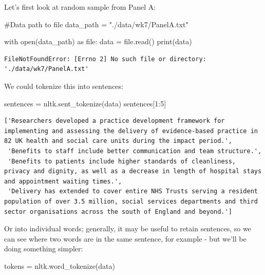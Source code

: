 \documentclass[
  letterpaper,
  DIV=11,
  numbers=noendperiod]{scrreprt}
\newenvironment{Shaded}{\begin{snugshade}}{\end{snugshade}}
\newcommand{\BuiltInTok}[1]{\textcolor[rgb]{0.00,0.23,0.31}{#1}}
\newcommand{\CommentTok}[1]{\textcolor[rgb]{0.37,0.37,0.37}{#1}}
\newcommand{\ControlFlowTok}[1]{\textcolor[rgb]{0.00,0.23,0.31}{#1}}
\newcommand{\DecValTok}[1]{\textcolor[rgb]{0.68,0.00,0.00}{#1}}
\newcommand{\ImportTok}[1]{\textcolor[rgb]{0.00,0.46,0.62}{#1}}
\newcommand{\NormalTok}[1]{\textcolor[rgb]{0.00,0.23,0.31}{#1}}
\newcommand{\OperatorTok}[1]{\textcolor[rgb]{0.37,0.37,0.37}{#1}}
\newcommand{\StringTok}[1]{\textcolor[rgb]{0.13,0.47,0.30}{#1}}
\begin{document}
Let's first look at random sample from Panel A:

\begin{Shaded}
\begin{Highlighting}[]
\CommentTok{\#Data path to file}
\NormalTok{data\_path }\OperatorTok{=} \StringTok{"./data/wk7/PanelA.txt"}

\ControlFlowTok{with} \BuiltInTok{open}\NormalTok{(data\_path) }\ImportTok{as} \BuiltInTok{file}\NormalTok{:}
\NormalTok{    data }\OperatorTok{=} \BuiltInTok{file}\NormalTok{.read()}
\BuiltInTok{print}\NormalTok{(data)}
\end{Highlighting}
\end{Shaded}

\begin{verbatim}
FileNotFoundError: [Errno 2] No such file or directory: './data/wk7/PanelA.txt'
\end{verbatim}

We could tokenize this into sentences:

\begin{Shaded}
\begin{Highlighting}[]
\NormalTok{sentences }\OperatorTok{=}\NormalTok{ nltk.sent\_tokenize(data)}
\NormalTok{sentences[}\DecValTok{1}\NormalTok{:}\DecValTok{5}\NormalTok{]}
\end{Highlighting}
\end{Shaded}

\begin{verbatim}
['Researchers developed a practice development framework for implementing and assessing the delivery of evidence-based practice in 82 UK health and social care units during the impact period.',
 'Benefits to staff include better communication and team structure.',
 'Benefits to patients include higher standards of cleanliness, privacy and dignity, as well as a decrease in length of hospital stays and appointment waiting times.',
 'Delivery has extended to cover entire NHS Trusts serving a resident population of over 3.5 million, social services departments and third sector organisations across the south of England and beyond.']
\end{verbatim}

Or into individual words; generally, it may be useful to retain
sentences, so we can see where two words are in the same sentence, for
example - but we'll be doing something simpler:

\begin{Shaded}
\begin{Highlighting}[]
\NormalTok{tokens }\OperatorTok{=}\NormalTok{ nltk.word\_tokenize(data)}
\end{Highlighting}
\end{Shaded}
\end{document}

